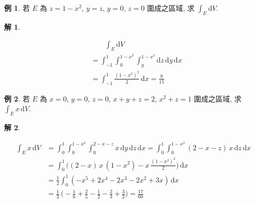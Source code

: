 \documentclass[12pt]{extarticle}
\newcommand{\ds}{\displaystyle}
\theoremstyle{definition}
\newtheorem*{ex}{例}
\newtheorem*{sol}{解}
\begin{document}
\begin{ex}
  若 $E$ 為 $z = 1 - x^2$, $y = z$, $y = 0$, $z = 0$ 圍成之區域, 求 $\ds\int_E \text{d}V$.
\end{ex}

\begin{sol}
  \begin{minipage}{0.75\textwidth}
    \includegraphics[scale=0.8,page=20]{fig/prob.pdf}\hspace{-3mm} 
    \includegraphics[scale=0.8,page=21]{fig/prob.pdf}\hspace{-3mm}
    \includegraphics[scale=0.8,page=22]{fig/prob.pdf} 
  \end{minipage}
  \begin{minipage}{0.25\textwidth}
    \begin{align*}
      &\qquad\int_E \text{d}V \\
      &= \int_{-1}^1\!\int_0^{1 - x^2}\!\!\!\!\!\int_{y}^{1 - x^2}\!\!\!\!\!\!\text{d}z\,\text{d}y\,\text{d}x \\
      &= \int_{-1}^1\frac{(1 - x^2)^2}{2}\,\text{d}x = \frac{8}{15}
    \end{align*}
  \end{minipage}
\end{sol}

\begin{ex}
  若 $E$ 為 $x = 0$, $y = 0$, $z = 0$, $x + y + z = 2$, $x^2 + z = 1$ 圍成之區域, 求 $\ds\int_E x\,\text{d}V$.
\end{ex}

\begin{sol}
  \begin{minipage}{0.25\textwidth}
    \includegraphics[scale=0.8,page=44]{fig/prob.pdf}
  \end{minipage}
  \begin{minipage}{0.75\textwidth}
    \begin{align*}
      \int_E x\,\text{d}V &= \int_0^1\!\!\int_0^{1 - x^2}\!\!\!\!\int_0^{2 - x - z}\!\!x\,\text{d}y\,\text{d}z\,\text{d}x = \int_0^1\!\!\int_0^{1 - x^2}(2 - x - z)\,x\,\text{d}z\,\text{d}x \\
      &= \int_0^1\bigg((2 - x)\,x\,(1 - x^2) - x\,\frac{(1 - x^2)^2}{2}\bigg)\,\text{d}x \\
      &= \frac{1}{2}\int_0^1 (-x^5 + 2x^4 - 2x^3 - 2x^2 + 3x)\,\text{d}x \\
      &= \frac{1}{2}\,\Big(-\frac{1}{6} + \frac{2}{5} - \frac{1}{2} - \frac{2}{3} + \frac{3}{2}\Big) = \frac{17}{60}
    \end{align*}
  \end{minipage}
\end{sol}
\end{document}
